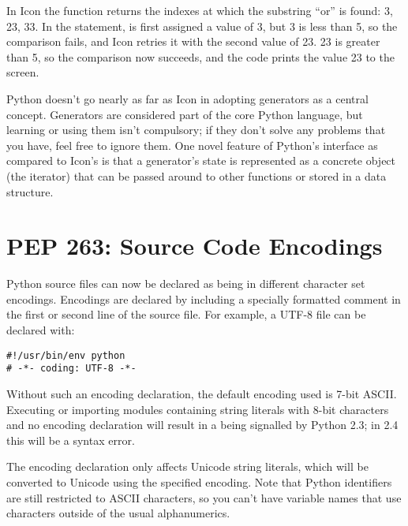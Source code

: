 \documentclass{howto}
\begin{document}
In Icon the  function returns the indexes at which the
substring ``or'' is found: 3, 23, 33.  In the  statement,
 is first assigned a value of 3, but 3 is less than 5, so the
comparison fails, and Icon retries it with the second value of 23.  23
is greater than 5, so the comparison now succeeds, and the code prints
the value 23 to the screen.

Python doesn't go nearly as far as Icon in adopting generators as a
central concept.  Generators are considered part of the core
Python language, but learning or using them isn't compulsory; if they
don't solve any problems that you have, feel free to ignore them.
One novel feature of Python's interface as compared to
Icon's is that a generator's state is represented as a concrete object
(the iterator) that can be passed around to other functions or stored
in a data structure.

\begin{seealso}


\end{seealso}


\section{PEP 263: Source Code Encodings \label{section-encodings}}

Python source files can now be declared as being in different
character set encodings.  Encodings are declared by including a
specially formatted comment in the first or second line of the source
file.  For example, a UTF-8 file can be declared with:

\begin{verbatim}
#!/usr/bin/env python
# -*- coding: UTF-8 -*-
\end{verbatim}

Without such an encoding declaration, the default encoding used is
7-bit ASCII.  Executing or importing modules containing string
literals with 8-bit characters and no encoding declaration will result
in a  being signalled by Python 2.3; in
2.4 this will be a syntax error.

The encoding declaration only affects Unicode string literals, which
will be converted to Unicode using the specified encoding.  Note that
Python identifiers are still restricted to ASCII characters, so you
can't have variable names that use characters outside of the usual
alphanumerics.
\end{document}
